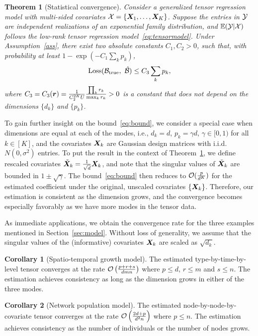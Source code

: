 \documentclass[twoside]{article}
\theoremstyle{plain}
\newtheorem{thm}{Theorem}[section]
\theoremstyle{definition}
\newtheorem{cor}{Corollary}
\begin{document}
  
\begin{thm}[Statistical convergence]\label{thm:main}
Consider a generalized tensor regression model with multi-sided covariates $\mathcal{X}=\{\bm X_1,\ldots,\bm X_K\}$. Suppose the entries in $\mathcal{Y}$ are independent realizations of an exponential family distribution, and $\mathbb{E}(\mathcal{Y}|\mathcal{X})$ follows the low-rank tensor regression model~\eqref{eq:tensormodel}. Under Assumption~\ref{ass}, there exist two absolute constants $C_1, C_2>0$, such that, with probability at least $1-\exp(-C_1\sum_k p_k)$, 
\begin{equation}\label{eq:bound}
\text{Loss}(\mathcal{B}_{\text{true}},\ \hat {\mathcal{B}}) \leq C_3\sum_k p_k,
\end{equation}
where $C_3=C_3(\bm{r})={1\over C^{2K}_2U}{\prod_k r_k \over \max_k r_k}>0$ is a constant that does not depend on the dimensions $\{d_k\}$ and $\{p_k\}$. 
\end{thm}

To gain further insight on the bound~\eqref{eq:bound}, we consider a special case when dimensions are equal at each of the modes, i.e., $d_k=d$, $p_k=\gamma d$, $\gamma\in [0,1)$ for all $k\in[K]$, and the covariates $\bm X_k$ are Gaussian design matrices with i.i.d.\ $N(0,\sigma^2)$ entries. To put the result in the context of Theorem~\ref{thm:main}, we define rescaled covariates $\check {\bm X}_k={1\over \sqrt{d}}\bm X_k$, and note that the singular values of $\check {\bm X}_k$ are bounded in $1\pm \sqrt{\gamma}$. The bound~\eqref{eq:bound} then reduces to $\mathcal{O}({p\over d^K})$ for the estimated coefficient under the original, unscaled covariates $\{\bm X_k\}$. Therefore, our estimation is consistent as the dimension grows, and the convergence becomes especially favorably as we have more modes in the tensor data. 

As immediate applications, we obtain the convergence rate for the three examples mentioned in Section~\ref{sec:model}. Without loss of generality, we assume that the singular values of the (informative) covariates $\bm X_k$ are scaled as $\sqrt{d_k}$. 
\begin{cor}[Spatio-temporal growth model] The estimated type-by-time-by-level tensor converges at the rate $\mathcal{O}\left({p+r+s\over dmn}\right)$ where $p\leq d$, $r\leq m$ and $s\leq n$. The estimation achieves consistency as long as the dimension grows in either of the three modes.
\end{cor}

\begin{cor} [Network population model] The estimated node-by-node-by-covariate tensor converges at the rate $\mathcal{O}\left({2d+p\over d^2n}\right)$ where $p\leq n$. The estimation achieves consistency as the number of individuals or the number of nodes grows. 
\end{cor}
\end{document}
